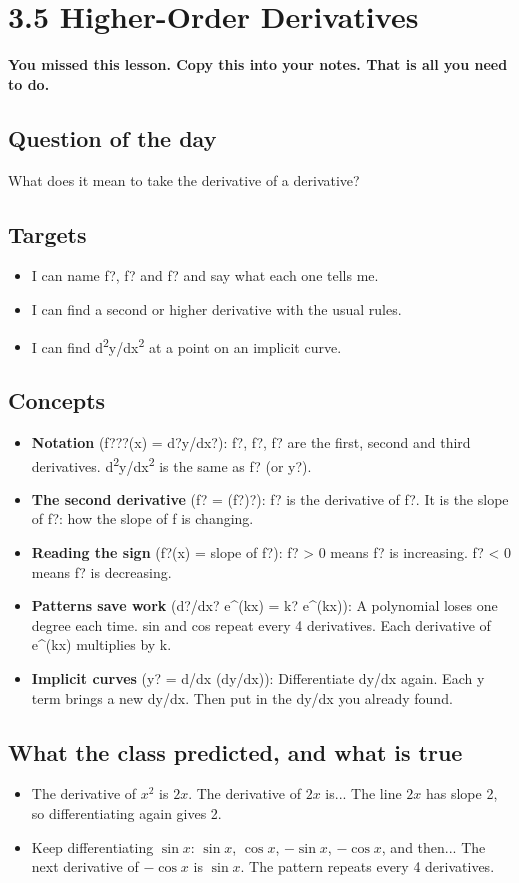 \documentclass[11pt]{article}
\begin{document}
\section*{3.5 Higher-Order Derivatives}
\textbf{You missed this lesson. Copy this into your notes. That is all you need to do.}\par\medskip
\subsection*{Question of the day}
What does it mean to take the derivative of a derivative?\par
\subsection*{Targets}\begin{itemize}\item I can name f?, f? and f? and say what each one tells me.
\item I can find a second or higher derivative with the usual rules.
\item I can find d\textsuperscript{2}y/dx\textsuperscript{2} at a point on an implicit curve.\end{itemize}
\subsection*{Concepts}\begin{itemize}
\item \textbf{Notation} (f???(x) = d?y/dx?): f?, f?, f? are the first, second and third derivatives. d\textsuperscript{2}y/dx\textsuperscript{2} is the same as f? (or y?).
\item \textbf{The second derivative} (f? = (f?)?): f? is the derivative of f?. It is the slope of f?: how the slope of f is changing.
\item \textbf{Reading the sign} (f?(x) = slope of f?): f? > 0 means f? is increasing. f? < 0 means f? is decreasing.
\item \textbf{Patterns save work} (d?/dx? e\textasciicircum{}(kx) = k? e\textasciicircum{}(kx)): A polynomial loses one degree each time. sin and cos repeat every 4 derivatives. Each derivative of e\textasciicircum{}(kx) multiplies by k.
\item \textbf{Implicit curves} (y? = d/dx (dy/dx)): Differentiate dy/dx again. Each y term brings a new dy/dx. Then put in the dy/dx you already found.
\end{itemize}
\subsection*{What the class predicted, and what is true}\begin{itemize}
\item The derivative of $x^2$ is $2x$. The derivative of $2x$ is...  The line $2x$ has slope 2, so differentiating again gives 2.
\item Keep differentiating $\sin x$: $\sin x$, $\cos x$, $-\sin x$, $-\cos x$, and then...  The next derivative of $-\cos x$ is $\sin x$. The pattern repeats every 4 derivatives.
\end{itemize}
\end{document}
